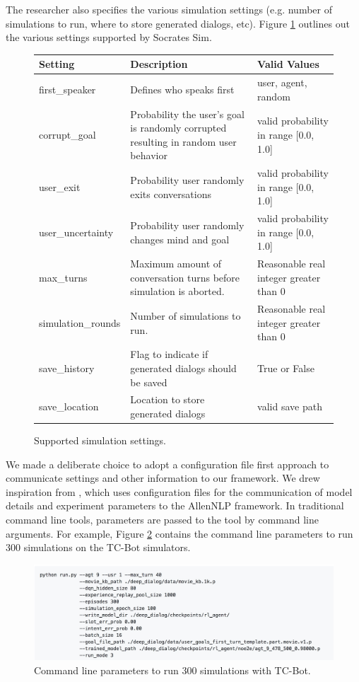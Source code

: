 The researcher also specifies the various simulation settings (e.g. number of simulations to run, where to store generated dialogs, etc). Figure \ref{fig:sim_settings} outlines out the various settings supported by Socrates Sim.

\begin{figure}[h!]
	\centering
	 \begin{tabular}{|l|p{5cm}|p{5cm}|}
		\hline 
		\textbf{Setting} &\textbf{ Description } & \textbf{Valid Values } \\ 
		\hline 
		first\_speaker & Defines who speaks first  & user, agent, random  \\ 
		\hline 
		corrupt\_goal & Probability the user's goal is randomly corrupted resulting in random user behavior  & valid probability in range [0.0, 1.0]  \\ 
		\hline 
		user\_exit & Probability user randomly exits conversations  & valid probability in range [0.0, 1.0]  \\ 
		\hline 
		user\_uncertainty & Probability user randomly changes mind and goal  & valid probability in range [0.0, 1.0]  \\ 
		\hline 
		max\_turns & Maximum amount of conversation turns before simulation is aborted.  &  Reasonable real integer greater than 0 \\ 
		\hline 
		simulation\_rounds & Number of simulations to run.  &  Reasonable real integer greater than 0 \\ 
		\hline 
		save\_history & Flag to indicate if generated dialogs should be saved & True or False  \\ 
		\hline 
		save\_location & Location to store generated dialogs  & valid save path  \\ 
		\hline 
	\end{tabular} 
	\caption{ Supported simulation settings.}
	\label{fig:sim_settings}
\end{figure}

We made a deliberate choice to adopt a configuration file first approach to communicate settings and other information to our framework. We drew inspiration from \cite{Gardner_allennlp}, which uses configuration files for the communication of model details and experiment parameters to the AllenNLP framework. In traditional command line tools, parameters are passed to the tool by command line arguments. For example, Figure \ref{fig:cmd_line_ex} contains the command line parameters to run 300 simulations on the TC-Bot simulators. 

\begin{figure}[h!]
	\centering
	\includegraphics[scale=.25]{diagrams/cmd_line_ex.jpeg}
	\caption{ Command line parameters to run 300 simulations with TC-Bot. }
	\label{fig:cmd_line_ex}
\end{figure}

